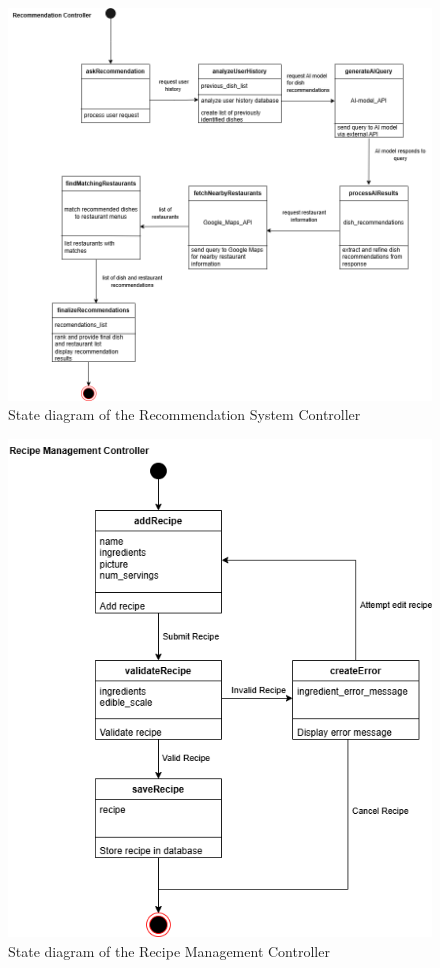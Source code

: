 \documentclass[]{article}
\begin{document}
\begin{figure}[H]
	\centering
	\includegraphics[width=\textwidth]{image/D3_state_diagrams/recommendation_system.png}
	\caption{State diagram of the Recommendation System Controller}
	\label{fig:recommendation_system_controller}
\end{figure}


\begin{figure}[H]
	\centering
	\includegraphics[width=\textwidth]{image/D3_state_diagrams/recipe_management.png}
	\caption{State diagram of the Recipe Management Controller}
	\label{fig:recipe_management_controller}
\end{figure}
\end{document}
